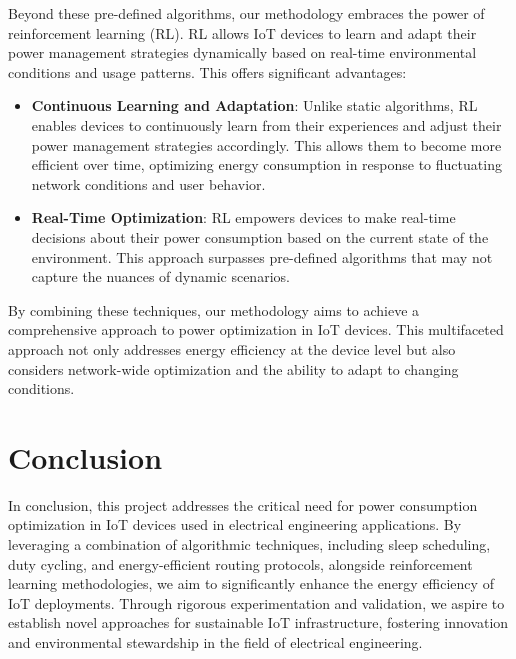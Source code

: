 \documentclass[11pt,a4paper]{article}
\begin{document}
Beyond these pre-defined algorithms, our methodology embraces the power of reinforcement learning (RL). RL allows IoT devices to learn and adapt their power management strategies dynamically based on real-time environmental conditions and usage patterns. This offers significant advantages:
\begin{itemize}
    \item \textbf{Continuous Learning and Adaptation}: Unlike static algorithms, RL enables devices to continuously learn from their experiences and adjust their power management strategies accordingly. This allows them to become more efficient over time, optimizing energy consumption in response to fluctuating network conditions and user behavior.

    \item \textbf{Real-Time Optimization}: RL empowers devices to make real-time decisions about their power consumption based on the current state of the environment. This approach surpasses pre-defined algorithms that may not capture the nuances of dynamic scenarios.
\end{itemize}

By combining these techniques, our methodology aims to achieve a comprehensive approach to power optimization in IoT devices. This multifaceted approach not only addresses energy efficiency at the device level but also considers network-wide optimization and the ability to adapt to changing conditions.

\section{Conclusion}
In conclusion, this project addresses the critical need for power consumption optimization in IoT devices used in electrical engineering applications. By leveraging a combination of algorithmic techniques, including sleep scheduling, duty cycling, and energy-efficient routing protocols, alongside reinforcement learning methodologies, we aim to significantly enhance the energy efficiency of IoT deployments. Through rigorous experimentation and validation, we aspire to establish novel approaches for sustainable IoT infrastructure, fostering innovation and environmental stewardship in the field of electrical engineering.
\end{document}
